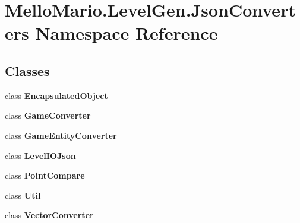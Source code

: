 \section{Mello\+Mario.\+Level\+Gen.\+Json\+Converters Namespace Reference}
\label{namespaceMelloMario_1_1LevelGen_1_1JsonConverters}
\subsection*{Classes}
\begin{DoxyCompactItemize}
\item 
class \textbf{ Encapsulated\+Object}
\item 
class \textbf{ Game\+Converter}
\item 
class \textbf{ Game\+Entity\+Converter}
\item 
class \textbf{ Level\+I\+O\+Json}
\item 
class \textbf{ Point\+Compare}
\item 
class \textbf{ Util}
\item 
class \textbf{ Vector\+Converter}
\end{DoxyCompactItemize}

